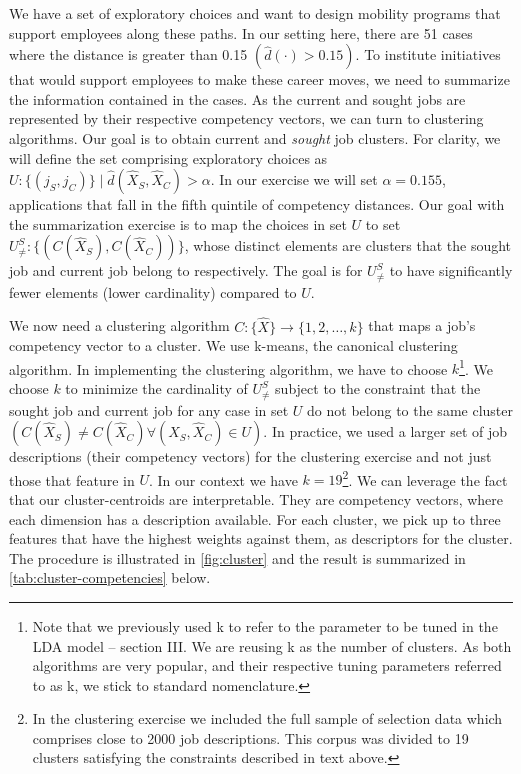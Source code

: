 \documentclass{article}
\begin{document}
We have a set of exploratory choices and want to design mobility programs that support employees along these paths. In our setting here, there are 51 cases where the distance is greater than 0.15 \((\hat{d}(\cdot) > 0.15)\). To institute initiatives that would support employees to make these career moves, we need to summarize the information contained in the cases. As the current and sought jobs are represented by their respective competency vectors, we can turn to clustering algorithms. Our goal is to obtain current and \textit{sought} job clusters. For clarity, we will define the set comprising exploratory choices as \(U: \{(j_S,j_C)\} \mid \hat{d}(\hat{X}_S, \hat{X}_C) > \alpha\). In our exercise we will set \(\alpha = 0.155\), applications that fall in the fifth quintile of competency distances. Our goal with the summarization exercise is to map the choices in set \(U\) to set \(U_{\neq}^S : \{(C(\hat{X}_S), C(\hat{X}_C))\}\), whose distinct elements are clusters that the sought job and current job belong to respectively. The goal is for \(U_{\neq}^S\) to have significantly fewer elements (lower cardinality) compared to \(U\).


We now need a clustering algorithm \(C: \{\hat{X}\} \rightarrow \{1,2,\ldots,k\}\) that maps a job’s competency vector to a cluster. We use k-means, the canonical clustering algorithm. In implementing the clustering algorithm, we have to choose \(k\)\footnote{Note that we previously used k to refer to the parameter to be tuned in the LDA model -- section III. We are reusing k as the number of clusters. As both algorithms are very popular, and their respective tuning parameters referred to as k, we stick to standard nomenclature.}. We choose \(k\) to minimize the cardinality of \(U_{\neq}^S\) subject to the constraint that the sought job and current job for any case in set \(U\) do not belong to the same cluster \((C(\hat{X}_S) \neq C(\hat{X}_C) \forall  (\hat{X}_S, \hat{X}_C) \in U)\). In practice, we used a larger set of job descriptions (their competency vectors) for the clustering exercise and not just those that feature in \(U\). In our context we have \(k = 19\)\footnote{In the clustering exercise we included the full sample of selection data which comprises close to 2000 job descriptions. This corpus was divided to 19 clusters satisfying the constraints described in text above.}. We can leverage the fact that our cluster-centroids are interpretable. They are competency vectors, where each dimension has a description available. For each cluster, we pick up to three features that have the highest weights against them, as descriptors for the cluster. The procedure is illustrated in \autoref{fig:cluster} and the result is summarized in \autoref{tab:cluster-competencies} below.
\end{document}
